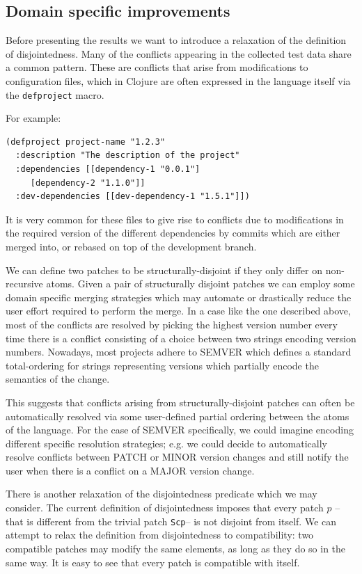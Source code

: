 \documentclass[11pt, titlepage]{article}
\newcommand{\toHaskell}[1]{\texttt{#1}\xspace}
\newcommand{\toClojure}[1]{\texttt{#1}\xspace}
\newcommand{\scp}{\toHaskell{Scp}}
\begin{document}
\subsection{Domain specific improvements}

Before presenting the results we want to introduce a relaxation of the definition of disjointedness. Many of the conflicts appearing in the collected test data share a common pattern. These are conflicts that arise from modifications to configuration files, which in Clojure are often expressed in the language itself via the \toClojure{defproject} macro.

For example:

\begin{verbatim}
(defproject project-name "1.2.3"
  :description "The description of the project"
  :dependencies [[dependency-1 "0.0.1"]
     [dependency-2 "1.1.0"]]
  :dev-dependencies [[dev-dependency-1 "1.5.1"]])
\end{verbatim}

It is very common for these files to give rise to conflicts due to modifications in the required version of the different dependencies by commits which are either merged into, or rebased on top of the development branch. 

We can define two patches to be structurally-disjoint if they only differ on non-recursive atoms. Given a pair of structurally disjoint patches we can employ some domain specific merging strategies which may automate or drastically reduce the user effort required to perform the merge. In a case like the one described above, most of the conflicts are resolved by picking the highest version number every time there is a conflict consisting of a choice between two strings encoding version numbers. Nowadays, most projects adhere to SEMVER \cite{semver} which defines a standard total-ordering for strings representing versions which partially encode the semantics of the change. 

This suggests that conflicts arising from structurally-disjoint patches can often be automatically resolved via some user-defined partial ordering between the atoms of the language. For the case of SEMVER specifically, we could imagine encoding different specific resolution strategies; e.g. we could decide to automatically resolve conflicts between PATCH or MINOR version changes and still notify the user when there is a conflict on a MAJOR version change.

There is another relaxation of the disjointedness predicate which we may consider. The current definition of disjointedness imposes that every patch $p$ -- that is different from the trivial patch \scp -- is not disjoint from itself. We can attempt to relax the definition from disjointedness to compatibility: two compatible patches may modify the same elements, as long as they do so in the same way. It is easy to see that every patch is compatible with itself.
\end{document}

